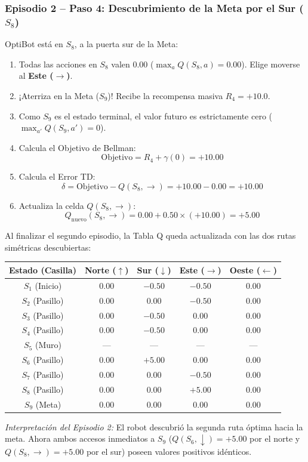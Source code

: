 \begin{calculomanual}
\subsubsection*{Episodio 2 -- Paso 4: Descubrimiento de la Meta por el Sur ($S_8$)}
OptiBot está en $S_8$, a la puerta sur de la Meta:
\begin{enumerate}
  \item Todas las acciones en $S_8$ valen $0.00$ ($\max_a Q(S_8, a) = 0.00$). Elige moverse al \textbf{Este ($\rightarrow$)}.
  \item ¡Aterriza en la Meta ($S_9$)! Recibe la recompensa masiva $R_4 = \mathbf{+10.0}$.
  \item Como $S_9$ es el estado terminal, el valor futuro es estrictamente cero ($\max_{a'} Q(S_9, a') = 0$).
  \item Calcula el Objetivo de Bellman:
  \[
    \text{Objetivo} = R_4 + \gamma (0) = \mathbf{+10.00}
  \]
  \item Calcula el Error TD:
  \[
    \delta = \text{Objetivo} - Q(S_8, \rightarrow) = +10.00 - 0.00 = \mathbf{+10.00}
  \]
  \item Actualiza la celda $Q(S_8, \rightarrow)$:
  \[
    Q_{\text{nuevo}}(S_8, \rightarrow) = 0.00 + 0.50 \times (+10.00) = \mathbf{+5.00}
  \]
\end{enumerate}

Al finalizar el segundo episodio, la Tabla Q queda actualizada con las dos rutas simétricas descubiertas:

\begin{center}
\small
\begin{tabular}{ccccc}
  \toprule
  \textbf{Estado (Casilla)} & \textbf{Norte ($\uparrow$)} & \textbf{Sur ($\downarrow$)} & \textbf{Este ($\rightarrow$)} & \textbf{Oeste ($\leftarrow$)} \\
  \midrule
  $S_1$ (Inicio)  & $0.00$ & $\mathbf{-0.50}$ & $-0.50$          & $0.00$ \\
  $S_2$ (Pasillo) & $0.00$ & $0.00$          & $-0.50$          & $0.00$ \\
  $S_3$ (Pasillo) & $0.00$ & $-0.50$         & $0.00$           & $0.00$ \\
  $S_4$ (Pasillo) & $0.00$ & $\mathbf{-0.50}$ & $0.00$          & $0.00$ \\
  $S_5$ (Muro)    & ---    & ---             & ---             & ---    \\
  $S_6$ (Pasillo) & $0.00$ & $+5.00$         & $0.00$          & $0.00$ \\
  $S_7$ (Pasillo) & $0.00$ & $0.00$          & $\mathbf{-0.50}$ & $0.00$ \\
  $S_8$ (Pasillo) & $0.00$ & $0.00$          & $\mathbf{+5.00}$ & $0.00$ \\
  $S_9$ (Meta)    & $0.00$ & $0.00$          & $0.00$           & $0.00$ \\
  \bottomrule
\end{tabular}
\end{center}
\textit{Interpretación del Episodio 2:} El robot descubrió la segunda ruta óptima hacia la meta. Ahora ambos accesos inmediatos a $S_9$ ($Q(S_6, \downarrow) = +5.00$ por el norte y $Q(S_8, \rightarrow) = +5.00$ por el sur) poseen valores positivos idénticos.


\end{calculomanual}
